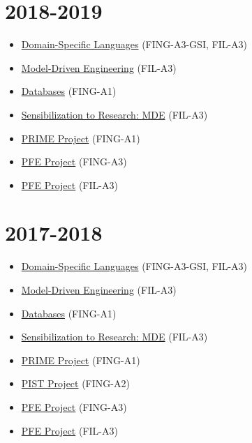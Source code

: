\hypertarget{section-2}{%
\section{2018-2019}\label{section-2}}

\begin{itemize}
\tightlist
\item
  \href{https://campusneo.mines-nantes.fr/campus/course/view.php?id=1767}{Domain-Specific
  Languages} (FING-A3-GSI, FIL-A3)
\item
  \href{https://campusneo.mines-nantes.fr/campus/course/view.php?id=1777}{Model-Driven
  Engineering} (FIL-A3)
\item
  \href{https://formations.imt-atlantique.fr/bd_ihm}{Databases}
  (FING-A1)
\item
  \href{https://campusneo.mines-nantes.fr/campus/course/view.php?id=1532}{Sensibilization
  to Research: MDE} (FIL-A3)
\item
  \href{https://campusneo.mines-nantes.fr/campus/course/view.php?id=621}{PRIME
  Project} (FING-A1)
\item
  \href{https://campusneo.mines-nantes.fr/campus/course/view.php?id=1540}{PFE
  Project} (FING-A3)
\item
  \href{https://campusneo.mines-nantes.fr/campus/course/view.php?id=1344}{PFE
  Project} (FIL-A3)
\end{itemize}

\hypertarget{section-3}{%
\section{2017-2018}\label{section-3}}

\begin{itemize}
\tightlist
\item
  \href{https://campusneo.mines-nantes.fr/campus/course/view.php?id=1687}{Domain-Specific
  Languages} (FING-A3-GSI, FIL-A3)
\item
  \href{https://campusneo.mines-nantes.fr/campus/course/view.php?id=1688}{Model-Driven
  Engineering} (FIL-A3)
\item
  \href{https://campusneo.mines-nantes.fr/campus/course/view.php?id=1679}{Databases}
  (FING-A1)
\item
  \href{https://campusneo.mines-nantes.fr/campus/course/view.php?id=1532}{Sensibilization
  to Research: MDE} (FIL-A3)
\item
  \href{https://campusneo.mines-nantes.fr/campus/course/view.php?id=621}{PRIME
  Project} (FING-A1)
\item
  \href{https://campusneo.mines-nantes.fr/campus/course/view.php?id=115}{PIST
  Project} (FING-A2)
\item
  \href{https://campusneo.mines-nantes.fr/campus/course/view.php?id=1540}{PFE
  Project} (FING-A3)
\item
  \href{https://campusneo.mines-nantes.fr/campus/course/view.php?id=1344}{PFE
  Project} (FIL-A3)
\end{itemize}

